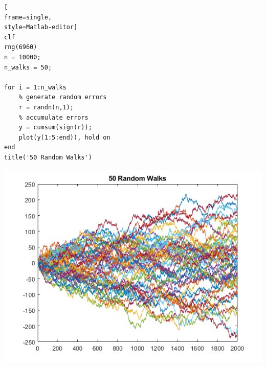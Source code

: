 \documentclass[letterpaper,12pt]{article}
\begin{document}
\begin{description}
\begin{lstlisting}[
frame=single,
style=Matlab-editor]
clf
rng(6960)
n = 10000;
n_walks = 50;

for i = 1:n_walks
    % generate random errors
    r = randn(n,1); 
    % accumulate errors
    y = cumsum(sign(r));	
    plot(y(1:5:end)), hold on
end
title('50 Random Walks')
\end{lstlisting}
\includegraphics[scale=0.7]{random_walks}

\end{description}
\end{document}
